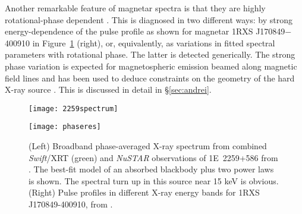 Another remarkable feature of magnetar spectra is that they are highly
rotational-phase dependent \citep{dkh08,dkh+08}.  This is diagnosed in two different ways:  by
strong energy-dependence of the pulse profile as shown for 
magnetar 1RXS J170849$-$400910 in Figure~\ref{fig:spectrum} (right),
or, equivalently, as variations in fitted spectral parameters with rotational phase.
The latter is detected generically.
The strong phase variation is expected for magnetospheric emission beamed along magnetic field lines
and has been used to deduce constraints on the geometry of the hard X-ray source
\citep{hbd14,vhk+14,aah+15,thy+15}.
This is discussed in detail in \S\ref{sec:andrei}. 

\begin{figure}
\begin{minipage}{2.9in}
\texttt{[image: 2259spectrum]}
\end{minipage}
\hfill
\hspace{-0.3in}
\begin{minipage}{2.9in}
\texttt{[image: phaseres]}
\end{minipage}
\caption{
(Left) 
Broadband phase-averaged X-ray spectrum from combined {\it Swift}/XRT (green) and {\it NuSTAR} observations of 1E~2259+586
from \citet{vhk+14}.  The best-fit model of an absorbed blackbody plus two power laws is shown.  The spectral
turn up in this source near 15 keV is obvious.
(Right) 
Pulse profiles in different X-ray energy bands for 1RXS J170849-400910,
from \citet{dkh08}.}
\label{fig:spectrum}
\end{figure}




